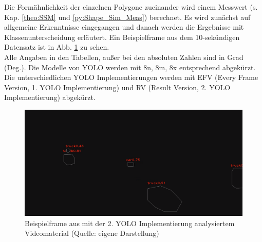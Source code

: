{Die Formähnlichkeit der einzelnen Polygone zueinander wird einem Messwert  (s. Kap. \ref{theo:SSM} und \ref{py:Shape_Sim_Meas}) berechnet. Es wird zunächst auf allgemeine Erkenntnisse eingegangen und danach werden die Ergebnisse mit Klassenunterscheidung erläutert. Ein Beispielframe aus dem 10-sekündigen Datensatz ist in Abb. \ref{Bsp_ErgebRVA10s_Vidmat} zu sehen.\\
Alle Angaben in den Tabellen, außer bei den absoluten Zahlen sind in Grad (Deg.). Die Modelle von YOLO werden mit 8n, 8m, 8x entsprechend abgekürzt. Die unterschiedlichen YOLO Implementierungen werden mit EFV (Every Frame Version, 1. YOLO Implementierung) und RV (Result Version, 2. YOLO Implementierung) abgekürzt.

\begin{figure}[ht]
	\centering
	\includegraphics*[scale = 0.35, keepaspectratio ]{images/Evaluation/Screenshot_A10s_RV.png}
	\caption[Beispielframe aus mit der direkten YOLO Anwendung analysiertem Videomaterial]{Beispielframe aus mit der 2. YOLO Implementierung analysiertem Videomaterial (Quelle: eigene Darstellung)} 
	\label{Bsp_ErgebRVA10s_Vidmat}
\end{figure}

}
